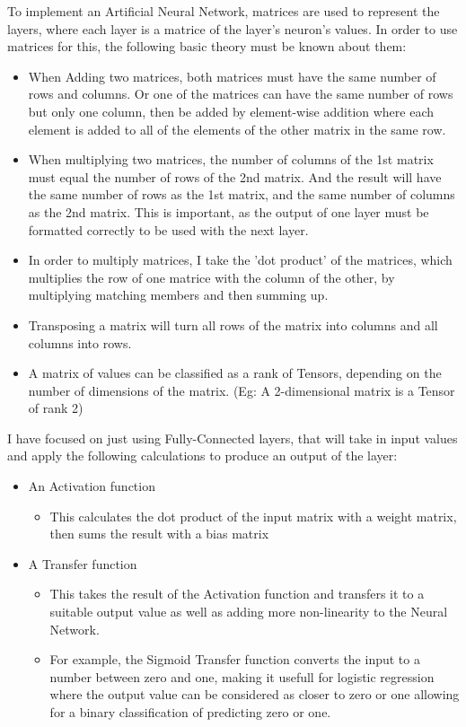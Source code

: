 \documentclass[./project-report/src/latex/project-report.tex]{subfiles}
\begin{document}
To implement an Artificial Neural Network, matrices are used to represent the layers, where each layer is a matrice of the layer's neuron's values. In 
order to use matrices for this, the following basic theory must be known about them:

\begin{itemize}
    \item When Adding two matrices, both matrices must have the same number of rows and columns. Or one of the matrices can have the same number of rows but only one 
          column, then be added by element-wise addition where each element is added to all of the elements of the other matrix in the same row.
    \item When multiplying two matrices, the number of columns of the 1st matrix must equal the number of rows of the 2nd matrix. And the result will have the same 
          number of rows as the 1st matrix, and the same number of columns as the 2nd matrix. This is important, as the output of one layer must be formatted correctly 
          to be used with the next layer.
    \item In order to multiply matrices, I take the 'dot product' of the matrices, which multiplies the row of one matrice with the column of the other, by multiplying 
          matching members and then summing up.
    \item Transposing a matrix will turn all rows of the matrix into columns and all columns into rows.
    \item A matrix of values can be classified as a rank of Tensors, depending on the number of dimensions of the matrix. (Eg: A 2-dimensional matrix is a Tensor of 
          rank 2)
\end{itemize}

I have focused on just using Fully-Connected layers, that will take in input values and apply the following calculations to produce an output of the layer:

\begin{itemize}
    \item An Activation function
    \begin{itemize}
        \item This calculates the dot product of the input matrix with a weight matrix, then sums the result with a bias matrix
    \end{itemize}
    \item A Transfer function
    \begin{itemize}
        \item This takes the result of the Activation function and transfers it to a suitable output value as well as adding more non-linearity to the Neural Network.
        \item For example, the Sigmoid Transfer function converts the input to a number between zero and one, making it usefull for logistic regression where the output 
              value can be considered as closer to zero or one allowing for a binary classification of predicting zero or one.
    \end{itemize}
\end{itemize}
\vspace{5mm}
\end{document}
